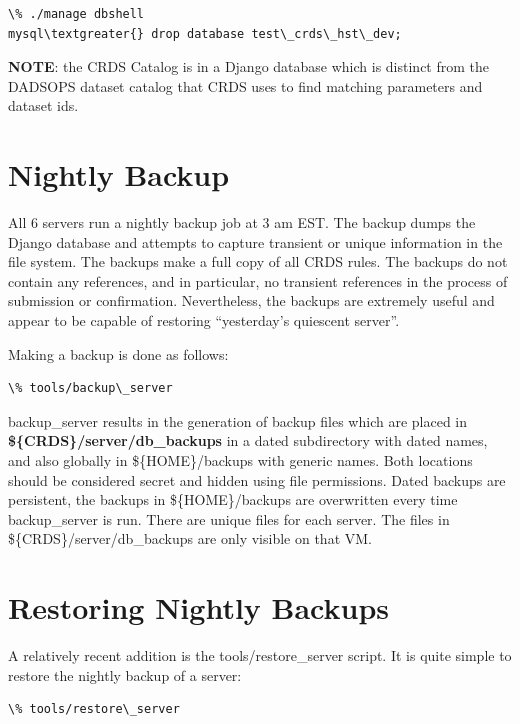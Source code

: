 \documentclass[letterpaper,10pt,english]{sphinxmanual}
\begin{document}
\begin{Verbatim}[commandchars=\\\{\}]
\% ./manage dbshell
mysql\textgreater{} drop database test\_crds\_hst\_dev;
\end{Verbatim}

\textbf{NOTE}:  the CRDS Catalog is in a Django database which is distinct from the DADSOPS dataset catalog that
CRDS uses to find matching parameters and dataset ids.


\section{Nightly Backup}
\label{server_guide:nightly-backup}
All 6 servers run a nightly backup job at 3 am EST.   The backup dumps the Django database and attempts to capture
transient or unique information in the file system.   The backups make a full copy of all CRDS rules.   The backups
do not contain any references,  and in particular,  no transient references in the process of submission or
confirmation.   Nevertheless,  the backups are extremely useful and appear to be capable of restoring
``yesterday's quiescent server''.

Making a backup is done as follows:

\begin{Verbatim}[commandchars=\\\{\}]
\% tools/backup\_server
\end{Verbatim}

backup\_server results in the generation of backup files which are placed in \textbf{\$\{CRDS\}/server/db\_backups} in a dated
subdirectory with dated names,  and also globally in \$\{HOME\}/backups with generic names.   Both locations should be
considered secret and hidden using file permissions.   Dated backups are persistent,  the backups in \$\{HOME\}/backups
are overwritten every time backup\_server is run.   There are unique files for each server.   The files in
\$\{CRDS\}/server/db\_backups are only visible on that VM.


\section{Restoring Nightly Backups}
\label{server_guide:restoring-nightly-backups}
A relatively recent addition is the tools/restore\_server script.   It is quite simple to restore the nightly backup
of a server:

\begin{Verbatim}[commandchars=\\\{\}]
\% tools/restore\_server
\end{Verbatim}
\end{document}
